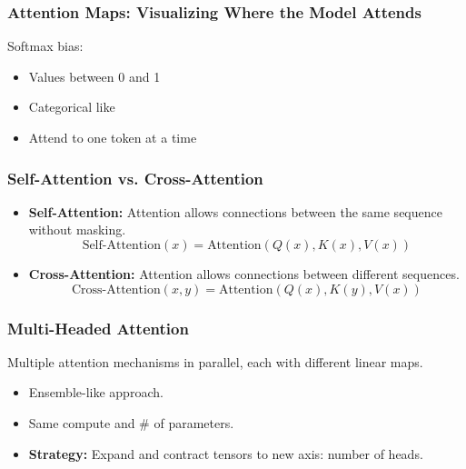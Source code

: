 \subsubsection{Attention Maps: Visualizing Where the Model Attends}
\begin{notes} Softmax bias:
    \begin{itemize}
        \item Values between 0 and 1
        \item Categorical like
        \item Attend to one token at a time
    \end{itemize}
\end{notes}
\newpage

\subsubsection{Self-Attention vs. Cross-Attention}
\begin{notes}
    \begin{itemize}
        \item \textbf{Self-Attention:} Attention allows connections between the same sequence without masking. 
        \begin{equation*}
            \text{Self-Attention}(x) = \text{Attention}(Q(x), K(x), V(x))
        \end{equation*}
        \item \textbf{Cross-Attention:} Attention allows connections between different sequences.
        \begin{equation*}
            \text{Cross-Attention}(x, y) = \text{Attention}(Q(x), K(y), V(x))
        \end{equation*}
    \end{itemize}
\end{notes}

\subsubsection{Multi-Headed Attention}
\begin{notes}
    Multiple attention mechanisms in parallel, each with different linear maps.
    \begin{itemize}
        \item Ensemble-like approach. 
        \item Same compute and \# of parameters. 
        \item \textbf{Strategy:} Expand and contract tensors to new axis: number of heads. 
    \end{itemize}
\end{notes}
\newpage

